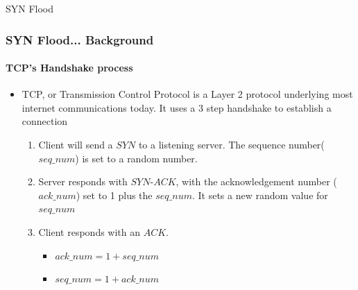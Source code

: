 \documentclass{beamer}
\begin{document}

\begin{frame}{SYN Flood}
\end{frame}

\begin{frame}
	\frametitle{SYN Flood... Background}
	\framesubtitle{TCP's Handshake process}
	\begin{itemize}
		\item TCP, or Transmission Control Protocol is a Layer 2 protocol underlying
			most internet communications today.  It uses a 3 step handshake to
			establish a connection
			\begin{enumerate}
				\item Client will send a $SYN$ to a listening server.  The sequence
					number($seq\_num$) is set to a random number.
				\item Server responds with $SYN$-$ACK$, with the acknowledgement number
					($ack\_num$) set to 1 plus the $seq\_num$.  It sets a new random value
					for $seq\_num$
				\item Client responds with an $ACK$.
					\begin{itemize}
						\item $ack\_num = 1 + seq\_num$
						\item $seq\_num = 1 + ack\_num$
					\end{itemize}
			\end{enumerate}
	\end{itemize}
\end{frame}
\end{document}
